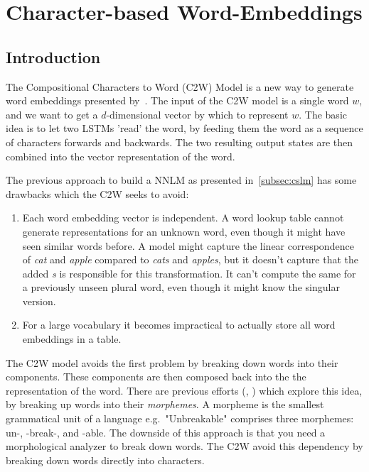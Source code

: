 \section{Character-based Word-Embeddings}
\label{sec:c2w}

\subsection{Introduction}


The Compositional Characters to Word (C2W) Model is a new way to generate word embeddings 
presented by~\cite{DBLP:journals/corr/LingLMAADBT15}.
The input of the C2W model is a single word $w$, and we want to get a $d$-dimensional vector by which to represent $w$.
The basic idea is to let two LSTMs 'read' the word, by feeding them the word as a sequence of characters forwards and backwards.
The two resulting output states are then combined into the vector representation of the word.

The previous approach to build a NNLM as presented in~\ref{subsec:cslm} has some drawbacks which the C2W seeks to avoid:
\begin{enumerate}
  \item Each word embedding vector is independent. A word lookup table cannot generate representations for an unknown word, 
        even though it might have seen similar words before.
        A model might capture the linear correspondence of \textit{cat} and \textit{apple} compared to \textit{cats} and \textit{apples}, 
        but it doesn't capture that the added \textit{s} is responsible for this transformation. 
        It can't compute the same for a previously unseen plural word, even though it might know the singular version.
  \item For a large vocabulary it becomes impractical to actually store all word embeddings in a table.
\end{enumerate}
The C2W model avoids the first problem by breaking down words into their components. These components are then composed
back into the the representation of the word. There are previous efforts (\cite{Luong-etal:conll13:morpho}, \cite{DBLP:journals/corr/BothaB14}) 
which explore this idea, by breaking up words into their \textit{morphemes}. A morpheme is the smallest grammatical unit of a language 
e.g.\ "Unbreakable" comprises three morphemes: un-, -break-, and -able.
The downside of this approach is that you need a morphological analyzer to break down words. The C2W avoid this dependency by
breaking down words directly into characters.


